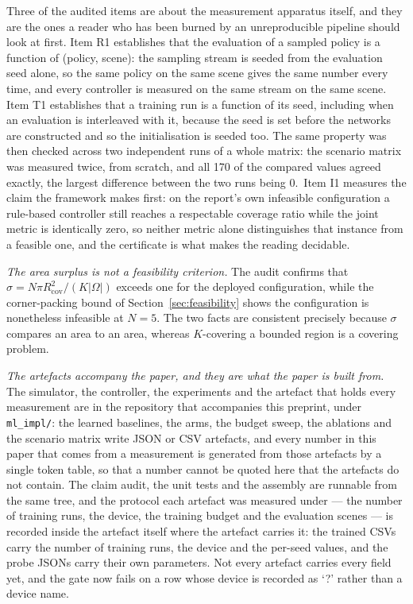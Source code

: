 \documentclass[conference]{IEEEtran}
\newcommand{\tokDeterminismText}{The same property was then checked across two independent runs of a whole matrix: the scenario matrix was measured twice, from scratch, and all 170 of the compared values agreed exactly, the largest difference between the two runs being 0.}
\begin{document}
Three of the audited items are about the measurement apparatus itself, and
they are the ones a reader who has been burned by an unreproducible
pipeline should look at first.  Item R1 establishes that the evaluation of
a sampled policy is a function of (policy, scene): the sampling stream is
seeded from the evaluation seed alone, so the same policy on the same scene
gives the same number every time, and every controller is measured on the
same stream on the same scene.  Item T1 establishes that a training run is
a function of its seed, including when an evaluation is interleaved with
it, because the seed is set before the networks are constructed and so the
initialisation is seeded too.  \tokDeterminismText\ Item I1 measures the claim the framework
makes first: on the report's own infeasible configuration a rule-based
controller still reaches a respectable coverage ratio while the joint
metric is identically zero, so neither metric alone distinguishes that
instance from a feasible one, and the certificate is what makes the reading
decidable.

\emph{The area surplus is not a feasibility criterion.} The audit confirms
that $\sigma=N\pi R_{\mathrm{cov}}^{2}/(K|\Omega|)$ exceeds one for the
deployed configuration, while the corner-packing bound of
Section~\ref{sec:feasibility} shows the configuration is nonetheless
infeasible at $N=5$. The two facts are consistent precisely because $\sigma$
compares an area to an area, whereas $K$-covering a bounded region is a
covering problem.

\emph{The artefacts accompany the paper, and they are what the paper is
built from.} The simulator, the controller, the experiments and the
artefact that holds every measurement are in the repository that
accompanies this preprint, under \texttt{ml\_impl/}: the learned baselines,
the arms, the budget sweep, the ablations and the scenario matrix write
JSON or CSV artefacts, and every number in this paper that comes from a
measurement is generated from those artefacts by a single token table, so
that a number cannot be quoted here that the
artefacts do not contain.  The claim audit, the unit tests and the
assembly are runnable from the same tree, and the protocol each artefact
was measured under --- the number of training runs, the device, the
training budget and the evaluation scenes --- is recorded inside the
artefact itself where the artefact carries it: the trained CSVs carry
the number of training runs, the device and the per-seed values, and
the probe JSONs carry their own parameters.  Not every artefact carries
every field yet, and the gate now fails on a row whose device is
recorded as `?' rather than a device name.
\end{document}

